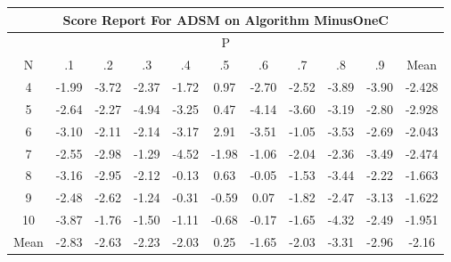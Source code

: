 \documentclass[11pt,a4paper]{report}
\begin{document}
\begin{longtable}{ | c || c | c | c | c | c | c | c | c | c || c |}
\hline
\multicolumn{11}{|c|}{ Score Report For ADSM on Algorithm MinusOneC} \\
\hline
\multicolumn{11}{|c|}{ P } \\
\hline
N & .1 & .2 & .3 & .4 & .5 & .6 & .7 & .8 & .9 & Mean\\
 \hline
 \hline
 \endhead
  4 &  \cellcolor[HTML]{FFCFCF} -1.99 &  \cellcolor[HTML]{FF9F9F} -3.72 &  \cellcolor[HTML]{FFC7C7} -2.37 &  \cellcolor[HTML]{FFD7D7} -1.72 &  \cellcolor[HTML]{E7E7FF} 0.97 &  \cellcolor[HTML]{FFB7B7} -2.70 &  \cellcolor[HTML]{FFBFBF} -2.52 &  \cellcolor[HTML]{FF9F9F} -3.89 &  \cellcolor[HTML]{FF9F9F} -3.90 & -2.428 \\
  5 &  \cellcolor[HTML]{FFBFBF} -2.64 &  \cellcolor[HTML]{FFC7C7} -2.27 &  \cellcolor[HTML]{FF8080} -4.94 &  \cellcolor[HTML]{FFAFAF} -3.25 &  \cellcolor[HTML]{F7F7FF} 0.47 &  \cellcolor[HTML]{FF9797} -4.14 &  \cellcolor[HTML]{FFA7A7} -3.60 &  \cellcolor[HTML]{FFAFAF} -3.19 &  \cellcolor[HTML]{FFB7B7} -2.80 & -2.928 \\
  6 &  \cellcolor[HTML]{FFAFAF} -3.10 &  \cellcolor[HTML]{FFC7C7} -2.11 &  \cellcolor[HTML]{FFC7C7} -2.14 &  \cellcolor[HTML]{FFAFAF} -3.17 &  \cellcolor[HTML]{B7B7FF} 2.91 &  \cellcolor[HTML]{FFA7A7} -3.51 &  \cellcolor[HTML]{FFE7E7} -1.05 &  \cellcolor[HTML]{FFA7A7} -3.53 &  \cellcolor[HTML]{FFBFBF} -2.69 & -2.043 \\
  7 &  \cellcolor[HTML]{FFBFBF} -2.55 &  \cellcolor[HTML]{FFB7B7} -2.98 &  \cellcolor[HTML]{FFDFDF} -1.29 &  \cellcolor[HTML]{FF8F8F} -4.52 &  \cellcolor[HTML]{FFCFCF} -1.98 &  \cellcolor[HTML]{FFE7E7} -1.06 &  \cellcolor[HTML]{FFCFCF} -2.04 &  \cellcolor[HTML]{FFC7C7} -2.36 &  \cellcolor[HTML]{FFA7A7} -3.49 & -2.474 \\
  8 &  \cellcolor[HTML]{FFAFAF} -3.16 &  \cellcolor[HTML]{FFB7B7} -2.95 &  \cellcolor[HTML]{FFC7C7} -2.12 &  \cellcolor[HTML]{FFFFFF} -0.13 &  \cellcolor[HTML]{EFEFFF} 0.63 &  \cellcolor[HTML]{FFFFFF} -0.05 &  \cellcolor[HTML]{FFD7D7} -1.53 &  \cellcolor[HTML]{FFA7A7} -3.44 &  \cellcolor[HTML]{FFC7C7} -2.22 & -1.663 \\
  9 &  \cellcolor[HTML]{FFBFBF} -2.48 &  \cellcolor[HTML]{FFBFBF} -2.62 &  \cellcolor[HTML]{FFDFDF} -1.24 &  \cellcolor[HTML]{FFF7F7} -0.31 &  \cellcolor[HTML]{FFEFEF} -0.59 &  \cellcolor[HTML]{FFFFFF} 0.07 &  \cellcolor[HTML]{FFCFCF} -1.82 &  \cellcolor[HTML]{FFBFBF} -2.47 &  \cellcolor[HTML]{FFAFAF} -3.13 & -1.622 \\
  10 &  \cellcolor[HTML]{FF9F9F} -3.87 &  \cellcolor[HTML]{FFCFCF} -1.76 &  \cellcolor[HTML]{FFD7D7} -1.50 &  \cellcolor[HTML]{FFE7E7} -1.11 &  \cellcolor[HTML]{FFEFEF} -0.68 &  \cellcolor[HTML]{FFF7F7} -0.17 &  \cellcolor[HTML]{FFD7D7} -1.65 &  \cellcolor[HTML]{FF8F8F} -4.32 &  \cellcolor[HTML]{FFBFBF} -2.49 & -1.951 \\
 \hline
 \hline
Mean &  \cellcolor[HTML]{FFB7B7} -2.83 &  \cellcolor[HTML]{FFBFBF} -2.63 &  \cellcolor[HTML]{FFC7C7} -2.23 &  \cellcolor[HTML]{FFCFCF} -2.03 &  \cellcolor[HTML]{F7F7FF} 0.25 &  \cellcolor[HTML]{FFD7D7} -1.65 &  \cellcolor[HTML]{FFCFCF} -2.03 &  \cellcolor[HTML]{FFAFAF} -3.31 &  \cellcolor[HTML]{FFB7B7} -2.96 &  \cellcolor[HTML]{FFC7C7} -2.16
\end{longtable}
\end{document}
